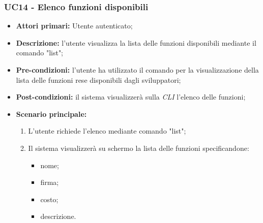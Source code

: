 \subsubsection{UC14 - Elenco funzioni disponibili}
\begin{itemize}
	\item \textbf{Attori primari:} Utente autenticato;
	\item \textbf{Descrizione:} l'utente visualizza la lista delle funzioni disponibili mediante il comando "list"; 
	\item \textbf{Pre-condizioni:} l'utente ha utilizzato il comando per la visualizzazione della lista delle funzioni rese disponibili dagli sviluppatori;
	\item \textbf{Post-condizioni:} il sistema visualizzerà sulla \textit{CLI\glo} l'elenco delle funzioni;
	\item \textbf{Scenario principale:} 
	\begin{enumerate}
		\item L'utente richiede l'elenco mediante comando "list";
		\item Il sistema visualizzerà su schermo la lista delle funzioni specificandone:
		\begin{itemize}
			\item nome;
			\item firma;
			\item costo;
			\item descrizione.
		\end{itemize}
	\end{enumerate}
\end{itemize}